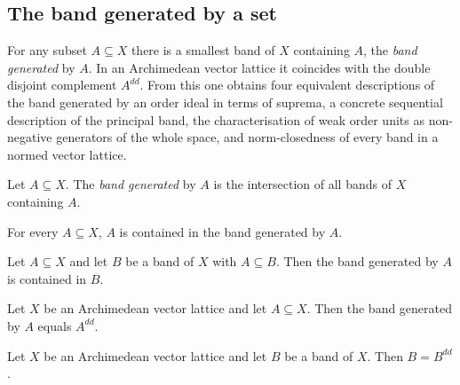 \subsection{The band generated by a set}

For any subset $A \subseteq X$ there is a smallest band of $X$
containing $A$, the \emph{band generated} by $A$. In an Archimedean
vector lattice it coincides with the double disjoint complement
$A^{dd}$. From this one obtains four equivalent descriptions of the
band generated by an order ideal in terms of suprema, a concrete
sequential description of the principal band, the characterisation of
weak order units as non-negative generators of the whole space, and
norm-closedness of every band in a normed vector lattice.

\begin{definition}
\label{def:band-generated}
\leanok
{}
Let $A \subseteq X$. The \emph{band generated} by $A$ is the
intersection of all bands of $X$ containing $A$.
\end{definition}

\begin{lemma}
\label{lem:band-subset-generated}
\leanok
{}
For every $A \subseteq X$, $A$ is contained in the band generated by
$A$.
\end{lemma}

\begin{lemma}
\label{lem:band-generated-le}
\leanok
{}
Let $A \subseteq X$ and let $B$ be a band of $X$ with $A \subseteq B$.
Then the band generated by $A$ is contained in $B$.
\end{lemma}

\begin{theorem}
\label{thm:band-disjointComplement-disjointComplement-eq-generated}
\leanok
{}
Let $X$ be an Archimedean vector lattice and let $A \subseteq X$. Then
the band generated by $A$ equals $A^{dd}$.
\end{theorem}

\begin{theorem}
\label{thm:band-eq-disjointComplement-disjointComplement}
\leanok
{}
Let $X$ be an Archimedean vector lattice and let $B$ be a band of $X$.
Then $B = B^{dd}$.
\end{theorem}

